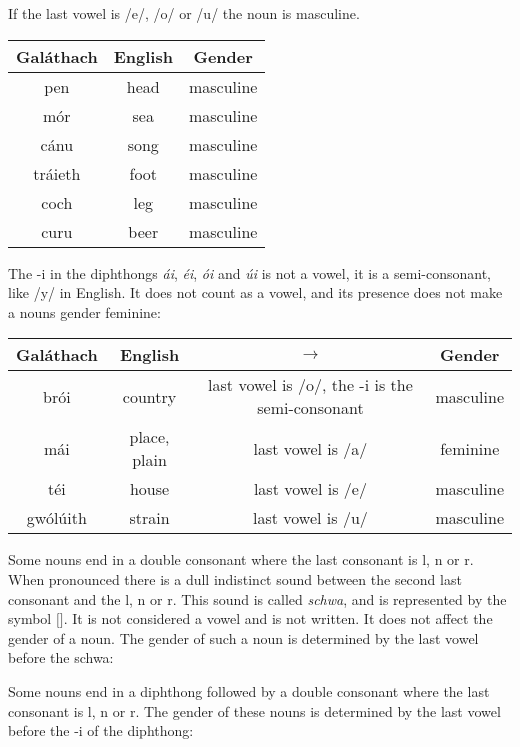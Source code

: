 If the last vowel is /e/, /o/ or /u/ the noun is masculine.
\begin{table}[H]
\centering
\begin{tabu}{c|c|c}
  \textbf{Gal\'{a}thach} & \textbf{English} & \textbf{Gender}\\
  \toprule
  pen & head & masculine\\
  m\'{o}r & sea & masculine\\
  c\'{a}nu & song & masculine\\
  tr\'{a}ieth & foot & masculine\\
  coch & leg & masculine\\
  curu & beer & masculine
\end{tabu}
\label{example_gender_last_vowel_eou}
\end{table}

The -i in the diphthongs \textit{\'{a}i}, \textit{\'{e}i}, \textit{\'{o}i} and \textit{\'{u}i} is not a vowel, it is a semi-consonant, like /y/ in English. It does not count as a vowel, and its presence does not make a nouns gender feminine:
\begin{table}[H]
\centering
\begin{tabu}{c|c|c|c}
  \textbf{Gal\'{a}thach} & \textbf{English} & $\rightarrow$ & \textbf{Gender}\\
  \toprule
  br\'{o}i & country & last vowel is /o/, the -i is the semi-consonant & masculine\\
  m\'{a}i & place, plain & last vowel is /a/ & feminine\\
  t\'{e}i & house & last vowel is /e/ & masculine\\
  gw\'{o}l\'{u}ith & strain & last vowel is /u/ & masculine
\end{tabu}
\label{example_gender_last_vowel_semi_consonant}
\end{table}

Some nouns end in a double consonant where the last consonant is l, n or r. When pronounced there is a dull indistinct sound between the second last consonant and the l, n or r. This sound is called \textit{schwa}, and is represented by the symbol $[$\textschwa$]$. It is not considered a vowel and is not written. It does not affect the gender of a noun. The gender of such a noun is determined by the last vowel before the schwa:

Some nouns end in a diphthong followed by a double consonant where the last consonant is l, n or r. The gender of these nouns is determined by the last vowel before the -i of the diphthong:

